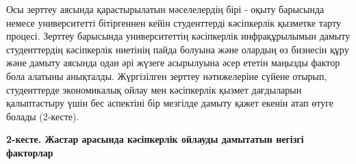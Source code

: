 Осы зерттеу аясында қарастырылатын мәселелердің бірі - оқыту барысында
немесе университетті бітіргеннен кейін студенттерді кәсіпкерлік қызметке
тарту процесі. Зерттеу барысында университеттің кәсіпкерлік
инфрақұрылымын дамыту студенттердің кәсіпкерлік ниетінің пайда болуына
және олардың өз бизнесін құру және дамыту аясында одан әрі жүзеге
асырылуына әсер ететін маңызды фактор бола алатыны анықталды.
Жүргізілген зерттеу нәтижелеріне сүйене отырып, студенттерде
экономикалық ойлау мен кәсіпкерлік қызмет дағдыларын қалыптастыру үшін
бес аспектіні бір мезгілде дамыту қажет екенін атап өтуге болады
(2-кесте).

{\bfseries 2-кесте. Жастар арасында кәсіпкерлік ойлауды дамытатын негізгі
факторлар}


